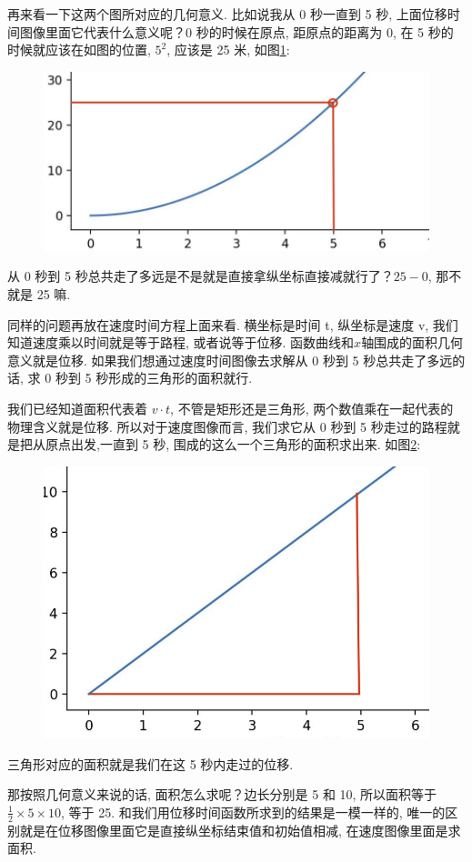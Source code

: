 再来看一下这两个图所对应的几何意义. 比如说我从 0 秒一直到 5 秒, 上面位移时间图像里面它代表什么意义呢？0 秒的时候在原点, 距原点的距离为 0, 在 5 秒的时候就应该在如图的位置, $5^2$, 应该是 25 米, 如图\ref{fig:img14_3}: 

\begin{figure}[ht]
  \centering
  \caption{}
  \label{fig:img14_3}
  \includegraphics[width=0.5\linewidth]{asset/20230904131050.png}
\end{figure}

从 0 秒到 5 秒总共走了多远是不是就是直接拿纵坐标直接减就行了？$25-0$, 那不就是 25 嘛. 

同样的问题再放在速度时间方程上面来看. 横坐标是时间 t, 纵坐标是速度 v, 我们知道速度乘以时间就是等于路程, 或者说等于位移. 函数曲线和$x$轴围成的面积几何意义就是位移. 如果我们想通过速度时间图像去求解从 0 秒到 5 秒总共走了多远的话, 求 0 秒到 5 秒形成的三角形的面积就行. 

我们已经知道面积代表着 $v\cdot t$, 不管是矩形还是三角形, 两个数值乘在一起代表的物理含义就是位移. 所以对于速度图像而言, 我们求它从 0 秒到 5 秒走过的路程就是把从原点出发,一直到 5 秒, 围成的这么一个三角形的面积求出来. 如图\ref{fig:img14_4}: 

\begin{figure}[ht]
  \centering
  \includegraphics[width=0.5\linewidth]{asset/20230904131921.png}
  \caption{}
  \label{fig:img14_4}
\end{figure}

三角形对应的面积就是我们在这 5 秒内走过的位移. 

那按照几何意义来说的话, 面积怎么求呢？边长分别是 5 和 10, 所以面积等于$\frac{1}{2} \times 5 \times 10$, 等于 25. 和我们用位移时间函数所求到的结果是一模一样的, 唯一的区别就是在位移图像里面它是直接纵坐标结束值和初始值相减, 在速度图像里面是求面积. 

